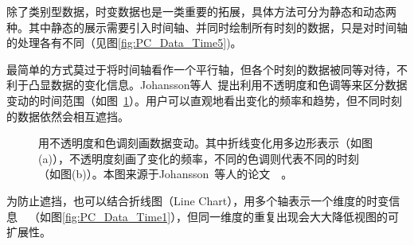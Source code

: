 \documentclass[12pt,twocolumn]{article}
\begin{document}
除了类别型数据，时变数据也是一类重要的拓展，具体方法可分为静态和动态两种。其中静态的展示需要引入时间轴、并同时绘制所有时刻的数据，只是对时间轴的处理各有不同（见图\ref{fig:PC_Data_Time5})。

最简单的方式莫过于将时间轴看作一个平行轴，但各个时刻的数据被同等对待，不利于凸显数据的变化信息。Johansson等人~\citep{johansson2007depth}提出利用不透明度和色调等来区分数据变动的时间范围（如图~\ref{fig:PC_Data_Time3}）。用户可以直观地看出变化的频率和趋势，但不同时刻的数据依然会相互遮挡。

\begin{figure}[!htb]
\centering
{}
\caption{\label{fig:PC_Data_Time3}用不透明度和色调刻画数据变动。其中折线变化用多边形表示（如图(a)），不透明度刻画了变化的频率，不同的色调则代表不同的时刻（如图(b)）。本图来源于Johansson~等人的论文~\citep{johansson2007depth}~。}
\end{figure}

为防止遮挡，也可以结合折线图（Line Chart），用多个轴表示一个维度的时变信息~\citep{edsall2003parallel}~\citep{dietzsch2009spray}（如图\ref{fig:PC_Data_Time1}），但同一维度的重复出现会大大降低视图的可扩展性。
\end{document}
